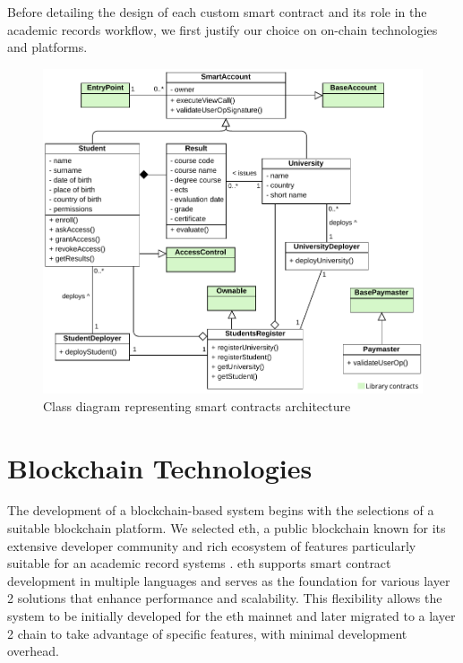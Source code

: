 Before detailing the design of each custom smart contract and its role in the academic records workflow, we first justify our choice on on-chain technologies and platforms. 

\begin{figure}
  \centering
  \includegraphics[width=1\textwidth]{figures/Contracts class diagram.pdf}
  \caption[Smart contracts architecture class diagram]{Class diagram representing smart contracts architecture}
  \label{fig:contractsClass}
\end{figure}

\section{Blockchain Technologies}
The development of a blockchain-based system begins with the selections of a suitable blockchain platform. We selected \acrlong{eth}, a public blockchain known for its extensive developer community and rich ecosystem of features particularly suitable for an academic record systems \cite{mustafa2024publiceduchain}\cite{yassynzhanbolatzhan2021verificationuniversitystudent}. \acrlong{eth} supports smart contract development in multiple languages and serves as the foundation for various layer 2 solutions that enhance performance and scalability\cite{sguanci2021layer2blockchainscaling}. This flexibility allows the system to be initially developed for the \acrlong{eth} mainnet and later migrated to a layer 2 chain to take advantage of specific features, with minimal development overhead. 

